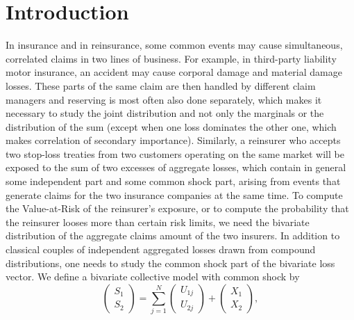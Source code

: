 \section{Introduction}
In insurance and in reinsurance, some common events may cause simultaneous, correlated claims in two lines of business. For example, in third-party liability motor insurance, an accident may cause corporal damage and material damage losses. These parts of the same claim are then handled by different claim managers and reserving is most often also done separately, which makes it necessary to study the joint distribution and not only the marginals or the distribution of the sum (except when one loss dominates the other one, which makes correlation of secondary importance). Similarly, a reinsurer who accepts two stop-loss treaties from two customers operating on the same market will be exposed to the sum of two excesses of aggregate losses, which contain in general some independent part and some common shock part, arising from events that generate claims for the two insurance companies at the same time. To compute the Value-at-Risk of the reinsurer's exposure, or to compute the probability that the reinsurer looses more than certain risk limits, we need the bivariate distribution of the aggregate claims amount of the two insurers. In addition to classical couples of independent aggregated losses drawn from compound distributions, one needs to study the common shock part of the bivariate loss vector.
We define a bivariate collective model with common shock by
\begin{equation}\label{ResinsuranceModelIntro}
\left( \begin{array}{l}
S_1 \\
S_2 \end{array}
\right)  =
 \displaystyle\sum_{j=1}^{N}
\left( \begin{array}{l}
U_{1j} \\
U_{2j} \end{array}
\right)
+
\left( \begin{array}{l}
X_{1} \\
X_{2} \end{array}
\right),
\end{equation}

